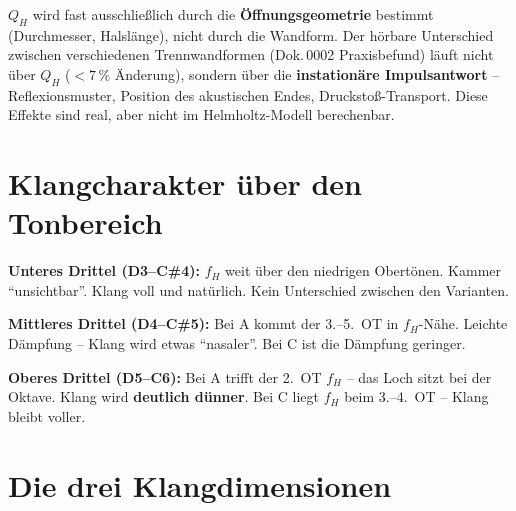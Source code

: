 \documentclass[11pt,a4paper]{article}
\begin{document}
\begin{keybox}
$Q_H$ wird fast ausschließlich durch die \textbf{Öffnungsgeometrie} bestimmt (Durchmesser, Halslänge), nicht durch die Wandform. Der hörbare Unterschied zwischen verschiedenen Trennwandformen (Dok.\,0002 Praxisbefund) läuft nicht über $Q_H$ ($< 7\,\%$ Änderung), sondern über die \textbf{instationäre Impulsantwort} -- Reflexionsmuster, Position des akustischen Endes, Druckstoß-Transport. Diese Effekte sind real, aber nicht im Helmholtz-Modell berechenbar.
\end{keybox}


\section{Klangcharakter über den Tonbereich}

\textbf{Unteres Drittel (D3--C\#4):} $f_H$ weit über den niedrigen Obertönen. Kammer ``unsichtbar''. Klang voll und natürlich. Kein Unterschied zwischen den Varianten.

\textbf{Mittleres Drittel (D4--C\#5):} Bei A kommt der 3.--5.~OT in $f_H$-Nähe. Leichte Dämpfung -- Klang wird etwas ``nasaler''. Bei C ist die Dämpfung geringer.

\textbf{Oberes Drittel (D5--C6):} Bei A trifft der 2.~OT $f_H$ -- das Loch sitzt bei der Oktave. Klang wird \textbf{deutlich dünner}. Bei C liegt $f_H$ beim 3.--4.~OT -- Klang bleibt voller.


\section{Die drei Klangdimensionen}

\begin{table}[H]
\centering\footnotesize
{}
\caption{Die drei Klangdimensionen. Position ist der dominante Hebel.}
\end{table}
\end{document}
